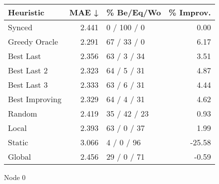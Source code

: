 \begin{tabular}{lrlr}
\toprule
\textbf{Heuristic} & \textbf{MAE ↓} & \textbf{\% Be/Eq/Wo} & \textbf{\% Improv.} \\
\midrule
            Synced &          2.441 &          0 / 100 / 0 &                0.00 \\
     Greedy Oracle &          2.291 &          67 / 33 / 0 &                6.17 \\
         Best Last &          2.356 &          63 / 3 / 34 &                3.51 \\
       Best Last 2 &          2.323 &          64 / 5 / 31 &                4.87 \\
       Best Last 3 &          2.333 &          63 / 6 / 31 &                4.44 \\
    Best Improving &          2.329 &          64 / 4 / 31 &                4.62 \\
            Random &          2.419 &         35 / 42 / 23 &                0.93 \\
             Local &          2.393 &          63 / 0 / 37 &                1.99 \\
            Static &          3.066 &           4 / 0 / 96 &              -25.58 \\
            Global &          2.456 &          29 / 0 / 71 &               -0.59 \\
\bottomrule
\end{tabular}
\caption{Node 0}
\label{tab:ds_non_lr05_le2_bs4_0}
